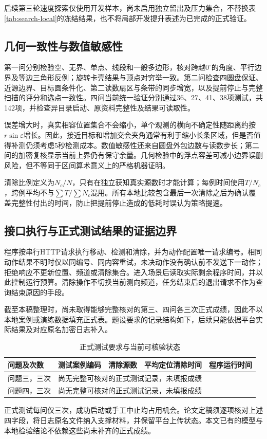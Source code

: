 \documentclass{JXUSTmodeling}
\begin{document}
后续第三轮速度探索仅使用开发样本，尚未启用独立留出及压力集合，不替换表\ref{tab:search-local}的冻结结果，也不将局部开发提升表述为已完成的正式验证。

\subsection{几何一致性与数值敏感性}
第一问分别检验空、无界、单点、线段和一般多边形，核对跨越$0^\circ$的角度、平行边界及等边三角形反例；旋转卡壳结果与顶点对穷举一致。第二问检查四圆盘保证、近源边界、目标圆条件化、第二读数扇区与条带的同步增宽，以及提前停止与完整扫描的评分和选点一致性。四问当前统一验证分别通过36、27、41、38项测试，共142项，并检查异目录启动、原资料完整性及结果可读取性。

误差增大时，真实相容位置集合不会缩小，单个观测的横向不确定性随距离约按$r\sin\varepsilon$增长。因此，接近目标和增加交会夹角通常有利于缩小长条区域，但是否值得补测仍须考虑5秒检测成本。数值敏感性还来自圆盘外包边数与读数步长；第二问的加密复核显示当前上界仍有保守余量。几何检验中的浮点容差可减小边界误删风险，但不等同于区间算术意义上的严格机器证明。

清除比例定义为$N_c/N$，只有在独立获知真实源数时才能计算；每例时间使用$T/N_c$，跨例平均不与$\sum T/\sum N_c$混用。所有本地比较包含最后一次清除之后为确认覆盖完整性付出的时间，防止把提前停止造成的低耗时误认为策略提速。

\subsection{接口执行与正式测试结果的证据边界}
程序按串行HTTP请求执行移动、检测和清除，并为动作配置唯一请求编号。相同动作结果不明时仅以同编号、同内容重试，未决动作没有确认前不发送下一动作；拒绝响应不更新位置、频道或清除集合。进入场景后读取实际剩余程序时间，并以此控制运行预算。清除操作不切换当前测向频道，任务结束后的退出请求不作为查询结束原因的手段。

截至本稿整理时，尚未取得能够完整核对的第三、四问各三次正式成绩，因此不以本地案例或演练数据填充正式表。题设要求的记录结构如下，后续只能依据平台实际结果及对应原名加密日志补入。
\begin{table}[htbp]
\centering\small
\caption{正式测试要求与当前可核验状态}
\begin{tabularx}{\textwidth}{lXXXX}
\toprule
问题及次数 & 测试案例编码 & 清除源数 & 平均定位清除时间 & 程序运行时间\\
\midrule
问题三，三次 & \multicolumn{4}{l}{尚无完整可核对的正式测试记录，未填报成绩}\\
问题四，三次 & \multicolumn{4}{l}{尚无完整可核对的正式测试记录，未填报成绩}\\
\bottomrule
\end{tabularx}
\end{table}
正式测试每问仅三次，成功启动或手工中止均占用机会。论文定稿须逐项核对上述四字段，将日志原名文件纳入支撑材料，并保留平台上传状态。本文已有的模型与本地检验结论不依赖这些尚未补齐的正式成绩。
\end{document}
